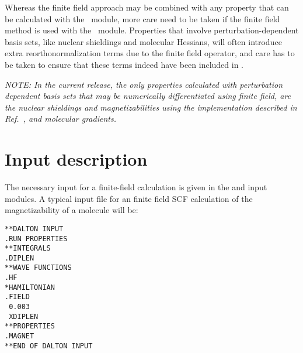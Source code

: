 Whereas the finite field approach may be combined with any property
that can be calculated with the \resp\ module, more care need to be
taken if the finite field method is used with the \aba\
module. Properties that involve perturbation-dependent basis
sets,
like nuclear shieldings and molecular Hessians, will often introduce
extra reorthonormalization terms due to the finite field operator, and
care has to be taken to ensure that these terms indeed have been
included in \dalton . 

{\em NOTE: In the current release, the only properties
calculated with perturbation dependent basis sets that may be
numerically differentiated using finite field, are the nuclear shieldings
and magnetizabilities using the implementation described in
Ref.~\cite{arthkrabmjpjjcp102}, and molecular gradients.} 

\section{Input description}\label{sec:finiteinput}

\begin{center}
\end{center}

The necessary input for a finite-field calculation
is given in the 
 and  input modules. A typical input file
for an finite field SCF calculation of the
magnetizability of a molecule will be:

\begin{verbatim}
**DALTON INPUT
.RUN PROPERTIES
**INTEGRALS
.DIPLEN
**WAVE FUNCTIONS
.HF
*HAMILTONIAN
.FIELD
 0.003
 XDIPLEN
**PROPERTIES
.MAGNET
**END OF DALTON INPUT
\end{verbatim}

